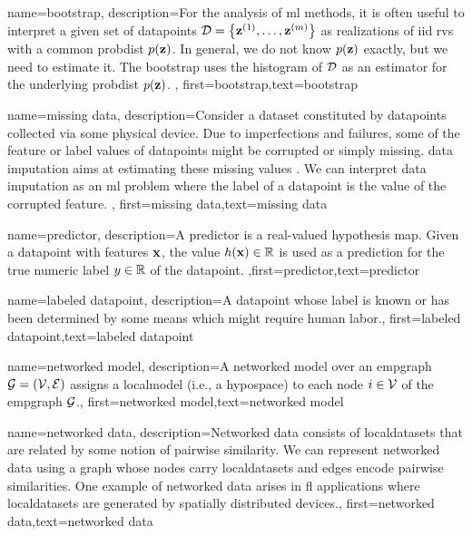 {name={bootstrap},
	description={For the analysis of \gls{ml} methods, it is often useful to interpret 
		a given set of \gls{datapoint}s $\mathcal{D} = \big\{ {\bf z}^{(1)},\ldots,{\bf z}^{(m)}\big\}$ 
		as \gls{realization}s of \gls{iid} \gls{rv}s with a common \gls{probdist} $p({\bf z})$. In general, we 
		do not know $p({\bf z})$ exactly, but we need to estimate it. The bootstrap uses the 
		histogram of $\mathcal{D}$ as an estimator for the underlying \gls{probdist} $p({\bf z})$. 
	},
	first={bootstrap},text={bootstrap}  
}



{name={missing data},
	description={Consider a \gls{dataset} constituted by \gls{datapoint}s collected via 
		some physical \gls{device}. Due to imperfections and failures, some of the \gls{feature} 
		or \gls{label} values of \gls{datapoint}s might be corrupted or simply missing. 
		\Gls{data} imputation aims at estimating these missing values \cite{Abayomi2008DiagnosticsFM}. 
		We can interpret \gls{data} imputation as an \gls{ml} problem where the \gls{label} of a \gls{datapoint} is 
		the value of the corrupted \gls{feature}. },
	first={missing data},text={missing data}  
}


{name={predictor},
	description={A predictor is a real-valued \gls{hypothesis} map. 
		Given a \gls{datapoint} with \gls{feature}s ${\bf x}$, the value 
		$h({\bf x}) \in \mathbb{R}$ is used as a \gls{prediction} for the true 
		numeric \gls{label} $y \in \mathbb{R}$ of the \gls{datapoint}. },first={predictor},text={predictor}  
}

{name={labeled datapoint},
 description={A \gls{datapoint} whose \gls{label} is known or has been determined 
 	by some means which might require human labor.},
 first={labeled datapoint},text={labeled datapoint}  
}



{name={networked model},
  description={A networked \gls{model} over an \gls{empgraph} $\mathcal{G} = \left( \mathcal{V},\mathcal{E} \right)$ assigns 
   a \gls{localmodel} (i.e., a \gls{hypospace}) to each node $i \in \mathcal{V}$ of the \gls{empgraph} $\mathcal{G}$.}, 
   first={networked model},text={networked model}  
}


{
	name={networked data},
	description={Networked \gls{data} consists of \gls{localdataset}s 
	that are related by some notion of pairwise similarity. We can represent networked 
	\gls{data} using a \gls{graph} whose nodes carry \gls{localdataset}s and edges encode 
	pairwise similarities. One example of networked \gls{data} arises in \gls{fl} applications 
	where \gls{localdataset}s are generated by spatially distributed \gls{device}s.}, 
	first={networked data},text={networked data}  
}


